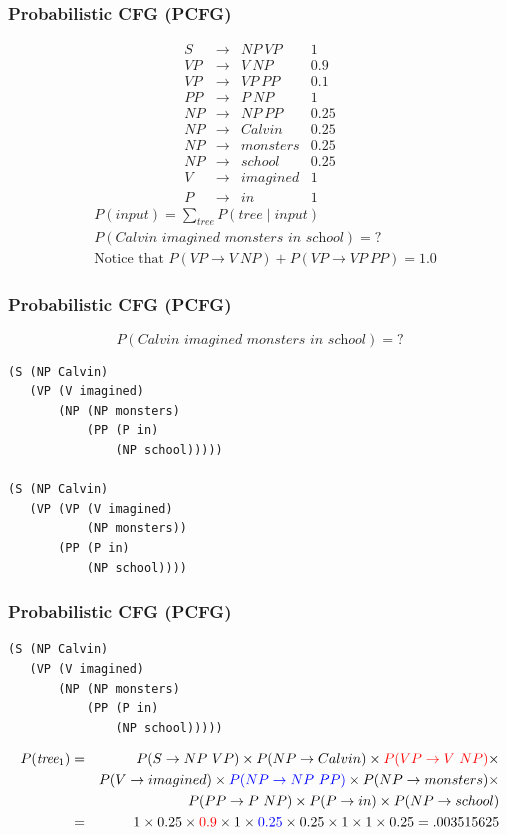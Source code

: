 \begin{frame}[fragile]
\frametitle{Probabilistic CFG (PCFG)}
\[
\begin{array}{cccc}
 S & \rightarrow & NP~VP  & 1 \\
 VP & \rightarrow & V~NP  & 0.9 \\
 VP & \rightarrow & VP~PP & 0.1 \\
 PP & \rightarrow & P~NP  & 1 \\
 NP & \rightarrow & NP~PP & 0.25 \\
 NP & \rightarrow & Calvin  & 0.25 \\
 NP & \rightarrow & monsters & 0.25 \\
 NP & \rightarrow & school & 0.25 \\
 V & \rightarrow & imagined  &  1 \\
 P & \rightarrow & in     & 1
\end{array}
\]
\begin{eqnarray}
&P(\textit{input}) = \sum_{\textit{tree}} P(\textit{tree} \mid \textit{input}) \nonumber\\
&P(\textit{Calvin imagined monsters in school}) = ? \nonumber\\
&\textrm{Notice that } P(VP \rightarrow V~NP) + P(VP \rightarrow VP~PP) = 1.0 \nonumber
\end{eqnarray}
\end{frame}

\begin{frame}[fragile]
\frametitle{Probabilistic CFG (PCFG)}
\[ P(\textit{Calvin imagined monsters in school}) = ? \]
\begin{verbatim}
(S (NP Calvin)
   (VP (V imagined)
       (NP (NP monsters)
           (PP (P in)
               (NP school)))))

(S (NP Calvin)
   (VP (VP (V imagined)
           (NP monsters))
       (PP (P in)
           (NP school))))
\end{verbatim}

\end{frame}

\begin{frame}[fragile]
\frametitle{Probabilistic CFG (PCFG)}
\begin{verbatim}
(S (NP Calvin)
   (VP (V imagined)
       (NP (NP monsters)
           (PP (P in)
               (NP school)))))
\end{verbatim}
{\small
\begin{eqnarray*}
P(\textit{tree$_1$})& = & P(S \rightarrow NP\ VP) \times
      P(NP \rightarrow Calvin) \times
      {\color{red} P(VP \rightarrow V\ NP)} \times \nonumber \\
&& P(V \rightarrow imagined) \times 
   {\color{blue} P(NP \rightarrow NP\ PP)} \times
   P(NP \rightarrow monsters) \times \nonumber \\
&& P(PP \rightarrow P\ NP) \times  
   P(P \rightarrow in) \times  
   P(NP \rightarrow school) \nonumber \\
& = & 1 \times 0.25 \times {\color{red} 0.9} \times 1 \times {\color{blue} 0.25} \times 0.25 \times 1 \times 1 \times 0.25 = .003515625 \nonumber 
\end{eqnarray*}
}
\end{frame}

